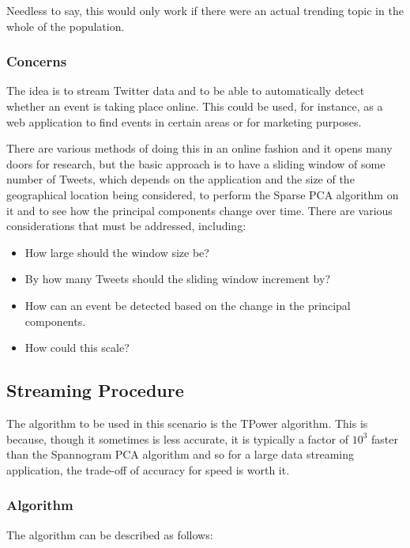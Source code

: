 \documentclass[11pt,a4paper]{article}
\begin{document}
Needless to say, this would only work if there were an actual trending topic in the whole of the population. 
\subsubsection{Concerns}
The idea is to stream Twitter data and to be able to automatically detect whether an event is taking place online. This could be used, for instance, as a web application to find events in certain areas or for marketing purposes. 

There are various methods of doing this in an online fashion and it opens many doors for research, but the basic approach is to have a sliding window of some number of Tweets, which depends on the application and the size of the geographical location being considered, to perform the Sparse PCA algorithm on it and to see how the principal components change over time. There are various considerations that must be addressed, including:
\begin{itemize}
\item How large should the window size be?
\item By how many Tweets should the sliding window increment by?
\item How can an event be detected based on the change in the principal components. 
\item How could this scale?
\end{itemize}

\subsection{Streaming Procedure}
The algorithm to be used in this scenario is the TPower algorithm. This is because, though it sometimes is less accurate, it is typically a factor of $10^3$ faster than the Spannogram PCA algorithm and so for a large data streaming application, the trade-off of accuracy for speed is worth it. 

\subsubsection{Algorithm}
The algorithm can be described as follows:
\end{document}
